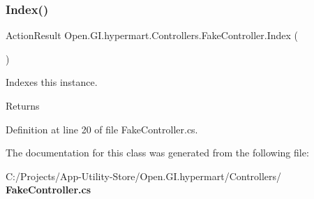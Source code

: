 \subsubsection{Index()}
{\footnotesize\ttfamily Action\+Result Open.\+G\+I.\+hypermart.\+Controllers.\+Fake\+Controller.\+Index (\begin{DoxyParamCaption}{ }\end{DoxyParamCaption})}



Indexes this instance. 

\begin{DoxyReturn}{Returns}

\end{DoxyReturn}


Definition at line 20 of file Fake\+Controller.\+cs.



The documentation for this class was generated from the following file\+:\begin{DoxyCompactItemize}
\item 
C\+:/\+Projects/\+App-\/\+Utility-\/\+Store/\+Open.\+G\+I.\+hypermart/\+Controllers/\textbf{ Fake\+Controller.\+cs}\end{DoxyCompactItemize}
